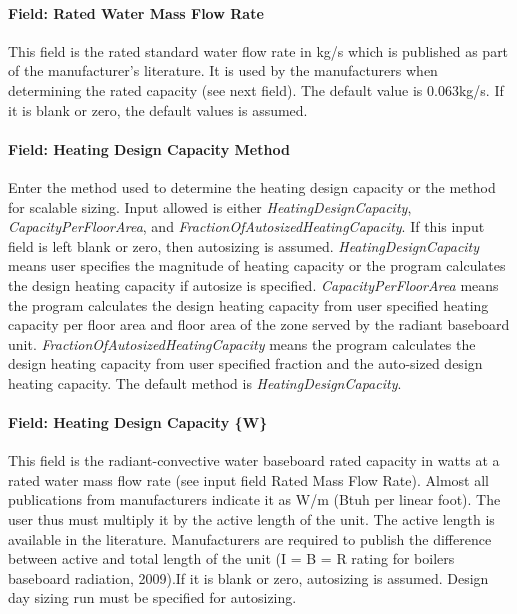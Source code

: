 \paragraph{Field: Rated Water Mass Flow Rate}\label{field-rated-water-mass-flow-rate}

This field is the rated standard water flow rate in kg/s which is published as part of the manufacturer's literature. It is used by the manufacturers when determining the rated capacity (see next field). The default value is 0.063kg/s. If it is blank or zero, the default values is assumed.

\paragraph{Field: Heating Design Capacity Method}\label{field-heating-design-capacity-method-000}

Enter the method used to determine the heating design capacity or the method for scalable sizing. Input allowed is either \emph{HeatingDesignCapacity}, \emph{CapacityPerFloorArea}, and \emph{FractionOfAutosizedHeatingCapacity}. If this input field is left blank or zero, then autosizing is assumed. \emph{HeatingDesignCapacity} means user specifies the magnitude of heating capacity or the program calculates the design heating capacity if autosize is specified. \emph{CapacityPerFloorArea} means the program calculates the design heating capacity from user specified heating capacity per floor area and floor area of the zone served by the radiant baseboard unit. \emph{FractionOfAutosizedHeatingCapacity} means the program calculates the design heating capacity from user specified fraction and the auto-sized design heating capacity. The default method is \emph{HeatingDesignCapacity}.

\paragraph{Field: Heating Design Capacity \{W\}}\label{field-heating-design-capacity-w-000}

This field is the radiant-convective water baseboard rated capacity in watts at a rated water mass flow rate (see input field Rated Mass Flow Rate). Almost all publications from manufacturers indicate it as W/m (Btuh per linear foot). The user thus must multiply it by the active length of the unit. The active length is available in the literature. Manufacturers are required to publish the difference between active and total length of the unit (I = B = R rating for boilers baseboard radiation, 2009).If it is blank or zero, autosizing is assumed. Design day sizing run must be specified for autosizing.

